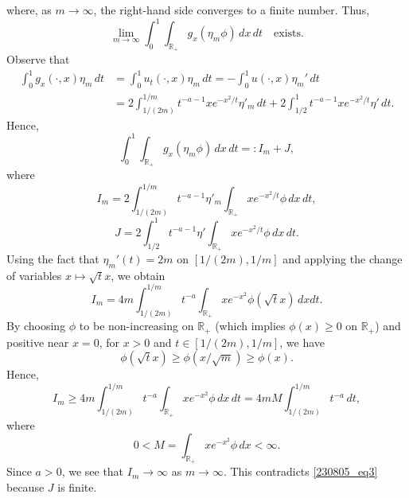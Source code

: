 \documentclass[reqno]{amsart}
\numberwithin{equation}{section}
\theoremstyle{plain}
\theoremstyle{definition}
\def\bR{\mathbb{R}}
\begin{document}
\begin{enumerate}[1.]
where, as $ m \to \infty$, the right-hand side converges to a finite number.
Thus, 
\begin{equation}		\label{230805_eq3}
\lim_{m\to \infty} \int_0^1 \int_{\bR_+} g_x(\eta_m \phi)\,dx\,dt \quad \text{exists}.
\end{equation}
Observe that 
$$
\begin{aligned}
\int_0^1  g_x(\cdot, x) \eta_m\,dt
&=\int_0^1 u_t(\cdot, x) \eta_m \,dt=-\int_0^1 u(\cdot, x) \eta_m'\,dt\\
&=2\int_{1/(2m)}^{1/m} t^{-a-1}x e^{-x^2/t}\eta'_m\,dt+ 2\int_{1/2}^1 t^{-a-1}x e^{-x^2/t}\eta'\,dt.
\end{aligned}
$$
Hence, 
$$
\int_0^1 \int_{\bR_+} g_x (\eta_m \phi)\,dx\,dt=:I_m+J, 
$$
where 
$$
I_m=2\int_{1/(2m)}^{1/m} t^{-a-1} \eta'_m\int_{\bR_+} x e^{-x^2/t}\phi\,dx\,dt,
$$
$$
J=2\int_{1/2}^1 t^{-a-1} \eta' \int_{\bR_+}x e^{-x^2/t}\phi\,dx\,dt.
$$
Using the fact that $\eta_m'(t)=2m$ on $[1/(2m), 1/m]$ and applying the change of variables $x \mapsto \sqrt{t}x$, we obtain
$$
I_m=4m\int^{1/m}_{1/(2m)} t^{-a}\int_{\bR_+} x e^{-x^2} \phi(\sqrt{t}x)\,dx dt.
$$
By choosing $\phi$ to be non-increasing on $\bR_+$ (which implies $\phi(x)\ge0$ on $\bR_+$) and positive near $x=0$, for $x>0$ and $t\in [1/(2m), 1/m]$, we have
$$
\phi(\sqrt{t}x) \ge \phi(x/\sqrt{m})\ge \phi(x).
$$
Hence, 
$$
I_m\ge 4m\int_{1/(2m)}^{1/m}t^{-a} \int_{\bR_+} x e^{-x^2}\phi\,dx\,dt= 4m M  \int_{1/(2m)}^{1/m} t^{-a}\,dt,
$$
where 
$$
0 <  M =   \int_{\bR_+}  x e^{-x^2}\phi\,dx<\infty.
$$
Since $a>0$, we see that $I_m\to \infty$ as $m\to \infty$.
This contradicts \eqref{230805_eq3} because $J$ is finite.

\bigskip


\end{enumerate}
\end{document}
